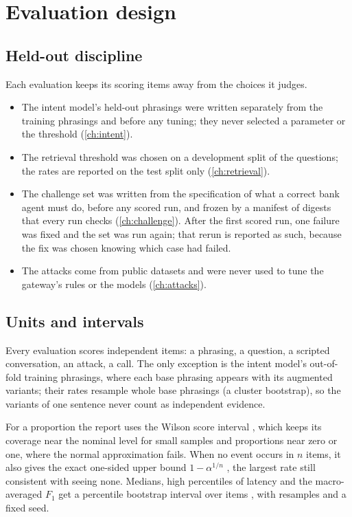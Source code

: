 \chapter{Evaluation design}\label{ch:design}

\section{Held-out discipline}

Each evaluation keeps its scoring items away from the choices it judges.
\begin{itemize}[leftmargin=*]
  \item The intent model's held-out phrasings were written separately from the training phrasings and before any
  tuning; they never selected a parameter or the threshold (\cref{ch:intent}).
  \item The retrieval threshold was chosen on a development split of the questions; the rates are reported on the
  test split only (\cref{ch:retrieval}).
  \item The challenge set was written from the specification of what a correct bank agent must do, before any scored
  run, and frozen by a manifest of digests that every run checks (\cref{ch:challenge}). After the first scored run,
  one failure was fixed and the set was run again; that rerun is reported as such, because the fix was chosen
  knowing which case had failed.
  \item The attacks come from public datasets and were never used to tune the gateway's rules or the models
  (\cref{ch:attacks}).
\end{itemize}

\section{Units and intervals}

Every evaluation scores independent items: a phrasing, a question, a scripted conversation, an attack, a call. The
only exception is the intent model's out-of-fold training phrasings, where each base phrasing appears with its
augmented variants; their rates resample whole base phrasings (a cluster bootstrap), so the variants of one sentence
never count as independent evidence.

For a proportion the report uses the Wilson score interval \parencite{wilson1927}, which keeps its coverage near
the nominal level for small samples and proportions near zero or one, where the normal approximation fails. When no
event occurs in $n$ items, it also gives the exact one-sided upper bound $1 - \alpha^{1/n}$
\parencite{clopper1934}, the largest rate still consistent with seeing none. Medians, high percentiles of latency
and the macro-averaged $F_1$ get a percentile bootstrap interval over items \parencite{efron1979}, with
 resamples and a fixed seed.

